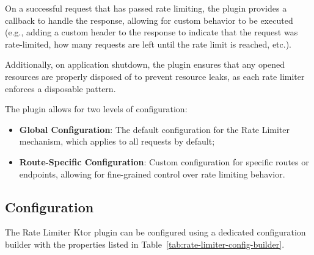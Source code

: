 On a successful request that has passed rate limiting, the plugin provides a callback to handle the response,
allowing for custom behavior to be executed (e.g., adding a custom header to the response to indicate that the request was rate-limited, how many requests are left until the rate limit is reached, etc.).

Additionally, on application shutdown,
the plugin ensures that any opened resources are properly disposed of to prevent resource leaks,
as each rate limiter enforces a disposable pattern.

The plugin allows for two levels of configuration:

\begin{itemize}
    \item \textbf{Global Configuration}: The default configuration for the Rate Limiter mechanism, which applies to all requests by default;
    \item \textbf{Route-Specific Configuration}: Custom configuration for specific routes or endpoints, allowing for fine-grained control over rate limiting behavior.
\end{itemize}

\subsection{Configuration}\label{subsec:rate-limiter-configuration}

The Rate Limiter Ktor plugin can be configured using a dedicated configuration builder with the properties listed in Table~\ref{tab:rate-limiter-config-builder}.

